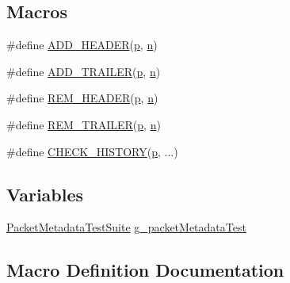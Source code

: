 \subsection*{Macros}
\begin{DoxyCompactItemize}
\item 
\#define \hyperlink{packet-metadata-test_8cc_a120012d48d29d678b3138d5c7b9bf714}{A\+D\+D\+\_\+\+H\+E\+A\+D\+ER}(\hyperlink{lte__link__budget__x2__handover__measures_8m_ac9de518908a968428863f829398a4e62}{p},  \hyperlink{lte__link__budget__x2__handover__measures_8m_abdb05bc5a064cf642a06c83b3392f148}{n})
\item 
\#define \hyperlink{packet-metadata-test_8cc_ab10bc130bb7184d47509ea44f4fb24df}{A\+D\+D\+\_\+\+T\+R\+A\+I\+L\+ER}(\hyperlink{lte__link__budget__x2__handover__measures_8m_ac9de518908a968428863f829398a4e62}{p},  \hyperlink{lte__link__budget__x2__handover__measures_8m_abdb05bc5a064cf642a06c83b3392f148}{n})
\item 
\#define \hyperlink{packet-metadata-test_8cc_a8694c61c9ba33c72896dde3628538a84}{R\+E\+M\+\_\+\+H\+E\+A\+D\+ER}(\hyperlink{lte__link__budget__x2__handover__measures_8m_ac9de518908a968428863f829398a4e62}{p},  \hyperlink{lte__link__budget__x2__handover__measures_8m_abdb05bc5a064cf642a06c83b3392f148}{n})
\item 
\#define \hyperlink{packet-metadata-test_8cc_a1e12d07d4d7c9ab1695230cdf925b4d6}{R\+E\+M\+\_\+\+T\+R\+A\+I\+L\+ER}(\hyperlink{lte__link__budget__x2__handover__measures_8m_ac9de518908a968428863f829398a4e62}{p},  \hyperlink{lte__link__budget__x2__handover__measures_8m_abdb05bc5a064cf642a06c83b3392f148}{n})
\item 
\#define \hyperlink{packet-metadata-test_8cc_a15a730e778d9d498a39e778bcd39684c}{C\+H\+E\+C\+K\+\_\+\+H\+I\+S\+T\+O\+RY}(\hyperlink{lte__link__budget__x2__handover__measures_8m_ac9de518908a968428863f829398a4e62}{p}, ...)
\end{DoxyCompactItemize}
\subsection*{Variables}
\begin{DoxyCompactItemize}
\item 
\hyperlink{classPacketMetadataTestSuite}{Packet\+Metadata\+Test\+Suite} \hyperlink{packet-metadata-test_8cc_a2ce4d2d291704725dc07dc16bc896c4a}{g\+\_\+packet\+Metadata\+Test}
\end{DoxyCompactItemize}


\subsection{Macro Definition Documentation}
